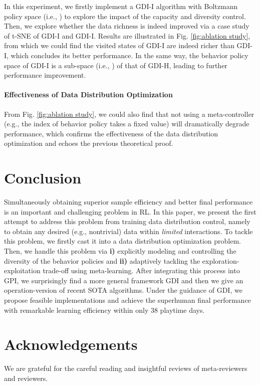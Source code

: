 \documentclass[nohyperref]{article}
\theoremstyle{plain}
\begin{document}
In this experiment, we firstly implement a GDI-I algorithm with Boltzmann policy space (i.e., ) to explore the impact of the  capacity and diversity control. Then, we explore whether the data richness is indeed improved via a case study of t-SNE of GDI-I and GDI-I. Results are illustrated in Fig. \ref{fig:ablation study}, from which we could find the visited states of GDI-I are indeed  richer than GDI-I, which concludes its better performance. In the same way, the behavior policy space of GDI-I is a sub-space (i.e., ) of that of GDI-H, leading to further performance improvement.

\paragraph{Effectiveness of  Data Distribution Optimization} 
From  Fig. \ref{fig:ablation study}, we could also find that not using a meta-controller (e.g., the index  of behavior policy takes a fixed value) will  dramatically degrade performance, which confirms the effectiveness of the data distribution optimization and echoes the previous theoretical proof.

\section{Conclusion}


Simultaneously obtaining superior sample efficiency and  better final performance is an important and challenging problem in RL. In this paper, we present the first attempt to address this problem from  training data distribution control, namely to obtain any desired (e.g., nontrivial) data within \emph{limited} interactions. To tackle this problem, we firstly cast it into a data distribution optimization problem. Then, we handle this problem via \textbf{i)} explicitly modeling and controlling the diversity  of the behavior policies and \textbf{ii)} adaptively tackling the  exploration-exploitation trade-off using meta-learning. After integrating this process into GPI, we surprisingly find a more general framework GDI and then we give an operation-version of recent SOTA algorithms. Under the guidance of GDI, we propose feasible implementations and achieve the superhuman final performance with remarkable learning efficiency within only 38 playtime days.




\section*{Acknowledgements}
We are grateful for the careful reading and insightful reviews of meta-reviewers and reviewers.
\end{document}
